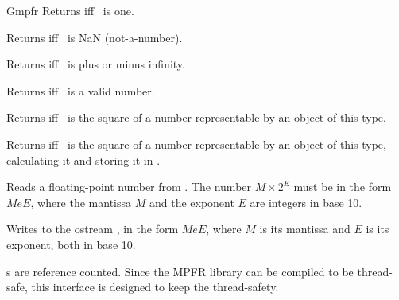 \begin{ccRefClass} {Gmpfr}
        {Returns  iff \ccVar~is one.}

        {Returns  iff \ccVar~is NaN (not-a-number).}

        {Returns  iff \ccVar~is plus or minus infinity.}

        {Returns  iff \ccVar~is a valid number.}

        {Returns  iff \ccVar~is the square of a number
        representable by an object of this type.}

        {Returns  iff \ccVar~is the square of a number
        representable by an object of this type, calculating it and storing
        it in .}



        {Reads a floating-point number from . The number
        \(M \times 2^E\) must be in the form \(MeE\), where the mantissa
        \(M\) and the exponent \(E\) are integers in base 10.}

        {Writes  to the ostream , in the form
        \(MeE\), where \(M\) is its mantissa and \(E\) is its exponent,
        both in base 10.}


\ccImplementation
{}s are reference counted. Since the MPFR library can be compiled
to be thread-safe, this interface is designed to keep the thread-safety.

\ccSeeAlso
{}\\

\end{ccRefClass}
